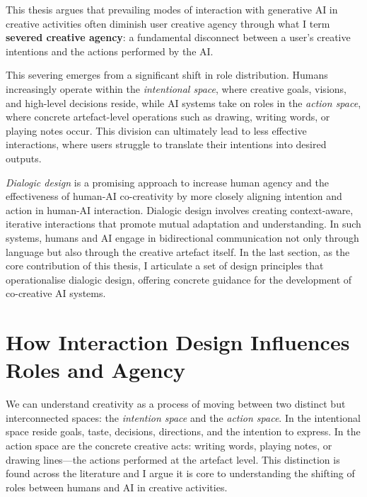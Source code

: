 This thesis argues that prevailing modes of interaction with generative AI in creative activities often diminish user creative agency through what I term \textbf{severed creative agency}: a fundamental disconnect between a user's creative intentions and the actions performed by the AI.

This severing emerges from a significant shift in role distribution. Humans increasingly operate within the \textit{intentional space}, where creative goals, visions, and high-level decisions reside, while AI systems take on roles in the \textit{action space}, where concrete artefact-level operations such as drawing, writing words, or playing notes occur. This division can ultimately lead to less effective interactions, where users struggle to translate their intentions into desired outputs. 

\textit{Dialogic design} is a promising approach to increase human agency and the effectiveness of human-AI co-creativity by more closely aligning intention and action in human-AI interaction. Dialogic design involves creating context-aware, iterative interactions that promote mutual adaptation and understanding. In such systems, humans and AI engage in bidirectional communication not only through language but also through the creative artefact itself. In the last section, as the core contribution of this thesis, I articulate a set of design principles that operationalise dialogic design, offering concrete guidance for the development of co-creative AI systems.

\section{How Interaction Design Influences Roles and Agency}

We can understand creativity as a process of moving between two distinct but interconnected spaces: the \textit{intention space} and the \textit{action space}. In the intentional space reside goals, taste, decisions, directions, and the intention to express. In the action space are the concrete creative acts: writing words, playing notes, or drawing lines—the actions performed at the artefact level. This distinction is found across the literature \cite{Palani2024-on} and I argue it is core to understanding the shifting of roles between humans and AI in creative activities.

